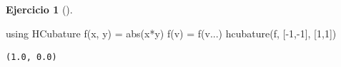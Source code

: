 \documentclass[
  a4paper,
]{scrreport}
\newenvironment{Shaded}{\begin{snugshade}}{\end{snugshade}}
\newcommand{\BuiltInTok}[1]{\textcolor[rgb]{0.00,0.23,0.31}{#1}}
\newcommand{\FloatTok}[1]{\textcolor[rgb]{0.68,0.00,0.00}{#1}}
\newcommand{\FunctionTok}[1]{\textcolor[rgb]{0.28,0.35,0.67}{#1}}
\newcommand{\ImportTok}[1]{\textcolor[rgb]{0.00,0.46,0.62}{#1}}
\newcommand{\NormalTok}[1]{\textcolor[rgb]{0.00,0.23,0.31}{#1}}
\newcommand{\OperatorTok}[1]{\textcolor[rgb]{0.37,0.37,0.37}{#1}}
\theoremstyle{definition}
\newtheorem{exercise}{Ejercicio}[chapter]
\theoremstyle{remark}
\begin{document}
\begin{exercise}[]
\begin{enumerate}
\begin{tcolorbox}
\begin{Shaded}
\begin{Highlighting}[]
\ImportTok{using} \BuiltInTok{HCubature}
\FunctionTok{f}\NormalTok{(x, y) }\OperatorTok{=} \FunctionTok{abs}\NormalTok{(x}\OperatorTok{*}\NormalTok{y)}
\FunctionTok{f}\NormalTok{(v) }\OperatorTok{=} \FunctionTok{f}\NormalTok{(v}\OperatorTok{...}\NormalTok{)}
\FunctionTok{hcubature}\NormalTok{(f, [}\OperatorTok{{-}}\FloatTok{1}\NormalTok{,}\OperatorTok{{-}}\FloatTok{1}\NormalTok{], [}\FloatTok{1}\NormalTok{,}\FloatTok{1}\NormalTok{])}
\end{Highlighting}
\end{Shaded}

\begin{verbatim}
(1.0, 0.0)
\end{verbatim}

  \end{tcolorbox}
\end{enumerate}

\end{exercise}
\end{document}

